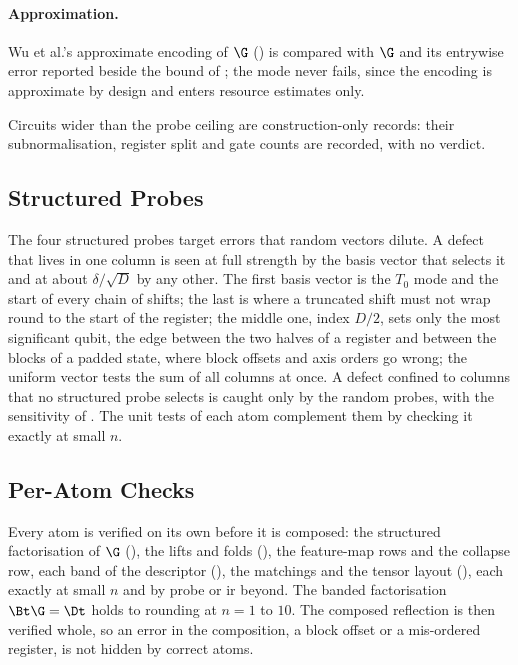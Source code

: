 \paragraph{Approximation.} Wu et al.'s approximate encoding of $\G$ () is compared with $\G$ and its entrywise error reported beside the bound of ; the mode never fails, since the encoding is approximate by design and enters resource estimates only.

Circuits wider than the probe ceiling are construction-only records: their subnormalisation, register split and gate counts are recorded, with no verdict.

\subsection{Structured Probes}
\label{app:structured-probes}

The four structured probes target errors that random vectors dilute. A defect that lives in one column is seen at full strength by the basis vector that selects it and at about $\delta/\sqrt D$ by any other. The first basis vector is the $T_0$ mode and the start of every chain of shifts; the last is where a truncated shift must not wrap round to the start of the register; the middle one, index $D/2$, sets only the most significant qubit, the edge between the two halves of a register and between the blocks of a padded state, where block offsets and axis orders go wrong; the uniform vector tests the sum of all columns at once. A defect confined to columns that no structured probe selects is caught only by the random probes, with the sensitivity of . The unit tests of each atom complement them by checking it exactly at small $n$.

\subsection{Per-Atom Checks}
\label{app:atom-residuals}

Every atom is verified on its own before it is composed: the structured factorisation of $\G$ (), the lifts and folds (), the feature-map rows and the collapse row, each band of the descriptor (), the matchings and the tensor layout (), each exactly at small $n$ and by probe or \gls{ir} beyond. The banded factorisation $\Bt\G=\Dt$ holds to rounding at $n=1$ to $10$. The composed reflection is then verified whole, so an error in the composition, a block offset or a mis-ordered register, is not hidden by correct atoms.

